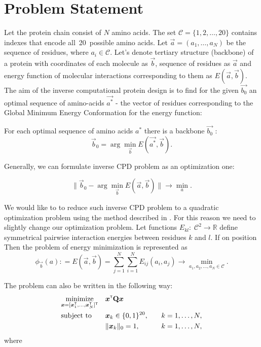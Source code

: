 \documentclass[12pt,twoside]{article}
\begin{document}
\section{Problem Statement}
Let the protein chain consist of $N$ amino acids. The set $\mathcal{C} = \{1, 2, \dots, 20\}$ contains indexes that encode all~20~possible amino acids. Let $\vec{a} = (a_1,\ldots,a_N)$ be the sequence of residues, where $a_i \in \mathcal{C}$.
Let's denote tertiary structure (backbone) of a protein with coordinates of each molecule as $\vec{b}$, sequence of residues as $\vec{a}$ and energy function of molecular interactions corresponding to them as $E(\vec{a},\vec{b})$. 
The aim of the inverse computational protein design is to find for the given $\vec{b_0}$ an optimal sequence of amino-acids $\vec{a^*}$ - the vector of residues corresponding to the Global Minimum Energy Conformation for the energy function:

For each optimal sequence of amino acids $a^*$ there is a backbone $\vec{b_0}$ : 
\begin{equation} 
\vec{b}_0 = \arg\min_{\vec{b}} E(\vec{a^*},\vec{b}).
\end{equation}

Generally, we can formulate inverse CPD problem as an optimization one:

\begin{equation}
\|\vec{b}_0 - \arg\min_{\vec{b}} E(\vec{a},\vec{b})\|\to \min_{a}.
\end{equation}

We would like to to reduce such inverse CPD problem to a quadratic optimization problem using the method described in \cite{Riazanov:2016}. For this reason we need to slightly change our optimization problem. Let functions $E_{kl}:\;\mathcal{C}^2\to\mathbb{R}$ define symmetrical pairwise interaction energies between residues $k$ and $l$. If on position Then the problem of energy minimization is represented as
\begin{equation}   
\label{2}
	\phi_{\vec{b}}(a): = E(\vec{a},\vec{b}) = \sum_{j=1}^N\sum_{i=1}^NE_{ij}(a_i,a_j) \rightarrow \underset{a_1,a_2,\dots,a_N \in \mathcal{C}}{\min}.
\end{equation}

The problem can also be written in the following way:
\begin{equation}
\label{3}
\begin{aligned}
	&\underset{\vec{x}=[\vec{x}_1\T,\dots,\vec{x}_N\T]\T}{\text{minimize}} &&\vec{x}\T\mathbf{Q}\vec{x} \\
	&\text{subject to} &&\vec{x}_k \in \{0,1\}^{20}, \quad &k=1,\dots, N,		\\
	&		         &&\|{\vec{x}_k}\|_0 =1,\quad &k=1,\dots,N,
\end{aligned}
\end{equation}
where
\end{document}
